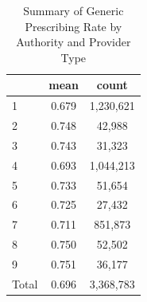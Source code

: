 \begin{table}[htbp]\centering
\def\sym#1{\ifmmode^{#1}\else\(^{#1}\)\fi}
\caption{Summary of Generic Prescribing Rate by Authority and Provider Type}
\begin{tabular}{l*{1}{cc}}
\toprule
                    &        mean&       count\\
\midrule
1                   &       0.679&   1,230,621\\
2                   &       0.748&      42,988\\
3                   &       0.743&      31,323\\
4                   &       0.693&   1,044,213\\
5                   &       0.733&      51,654\\
6                   &       0.725&      27,432\\
7                   &       0.711&     851,873\\
8                   &       0.750&      52,502\\
9                   &       0.751&      36,177\\
Total               &       0.696&   3,368,783\\
\bottomrule
\end{tabular}
\end{table}
